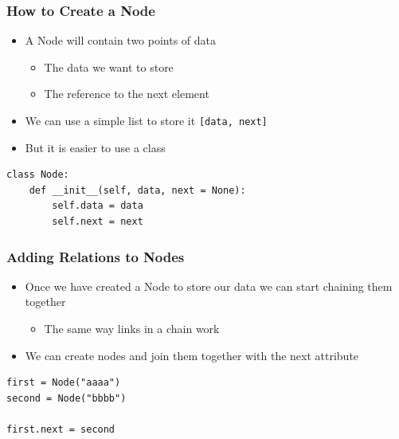 \documentclass[11pt]{beamer}
\begin{document}
	\begin{frame}[fragile]
		\frametitle{How to Create a Node}
		\begin{itemize}
			\item A Node will contain two points of data
			\begin{itemize}
				\item The data we want to store
				\item The reference to the next element
			\end{itemize}
			\item We can use a simple list to store it \lstinline|[data, next]|
			\item But it is easier to use a class
		\end{itemize}
\pause
\begin{lstlisting}
class Node:
	def __init__(self, data, next = None):
		self.data = data
		self.next = next
\end{lstlisting}
	\end{frame}

	\begin{frame}[fragile]
		\frametitle{Adding Relations to Nodes}
		\begin{itemize}
			\item Once we have created a Node to store our data we can start chaining them together
			\begin{itemize}
				\item The same way links in a chain work
			\end{itemize}
			\item We can create nodes and join them together with the next attribute
		\end{itemize}
		\vspace{0.5cm}
  		\begin{center}
  		\end{center}
        \vspace{0.2cm}
        \pause
\begin{lstlisting}
first = Node("aaaa")
second = Node("bbbb")

first.next = second
\end{lstlisting}
		
	\end{frame}
\end{document}
